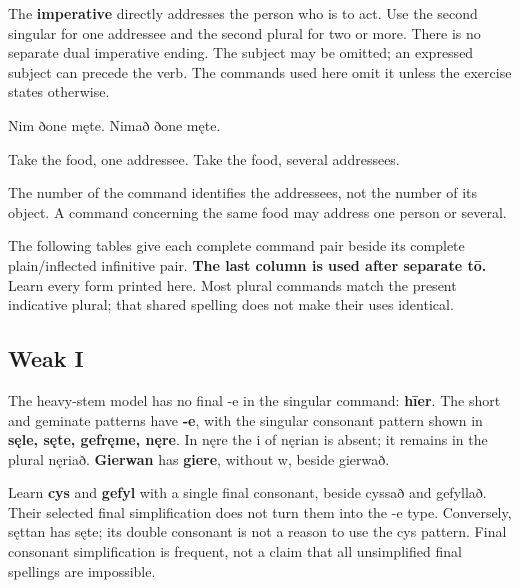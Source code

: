 The \textbf{imperative} directly addresses the person who is to act. Use the second singular for one addressee and the second plural for two or more. There is no separate dual imperative ending. The subject may be omitted; an expressed subject can precede the verb. The commands used here omit it unless the exercise states otherwise.

Nim ðone męte. Nimað ðone męte.

Take the food, one addressee. Take the food, several addressees.

The number of the command identifies the addressees, not the number of its object. A command concerning the same food may address one person or several.

The following tables give each complete command pair beside its complete plain/\allowbreak{}inflected infinitive pair. \textbf{The last column is used after separate tō.} Learn every form printed here. Most plural commands match the present indicative plural; that shared spelling does not make their uses identical.

\subsection*{Weak I}

The heavy-stem model has no final -e in the singular command: \textbf{hīer}. The short and geminate patterns have \textbf{-e}, with the singular consonant pattern shown in \textbf{sęle, sęte, gefręme, nęre}. In nęre the i of nęrian is absent; it remains in the plural nęriað. \textbf{Gierwan} has \textbf{giere}, without w, beside gierwað.

Learn \textbf{cys} and \textbf{gefyl} with a single final consonant, beside cyssað and gefyllað. Their selected final simplification does not turn them into the -e type. Conversely, sęttan has sęte; its double consonant is not a reason to use the cys pattern. Final consonant simplification is frequent, not a claim that all unsimplified final spellings are impossible.

